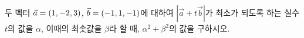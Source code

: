 두 벡터 $\vec{a}=(1{,}\mkern3mu\mathopen{}-2{,}\mkern3mu\mathopen{}3)$, $\vec{b}=(-1{,}\mkern3mu\mathopen{}1{,}\mkern3mu\mathopen{}-1)$에 대하여 $|\vec{a}+t\vec{b}|$가 최소가 되도록 하는 실수 $t$의 값을 $\alpha$, 이때의 최솟값을 $\beta$라 할 때, $\alpha^2+\beta^2$의 값을 구하시오.
